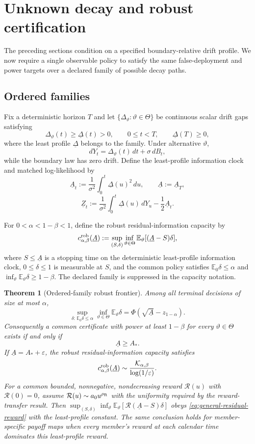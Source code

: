 \documentclass[11pt]{article}
\numberwithin{equation}{section}
\theoremstyle{plain}
\newtheorem{theorem}{Theorem}[section]
\theoremstyle{definition}
\theoremstyle{remark}
\newcommand{\Ezero}{\mathbb E_0}
\begin{document}
\section{Unknown decay and robust certification}\label{unknown-decay-robust-certification}

The preceding sections condition on a specified boundary-relative drift profile.  We now require a single observable policy to satisfy the same false-deployment and power targets over a declared family of possible decay paths.

\subsection{Ordered families}\label{ordered-unknown-decay}

Fix a deterministic horizon $T$ and let $\{\Delta_\vartheta:\vartheta\in\Theta\}$ be continuous scalar drift gaps satisfying
\[
\Delta_\vartheta(t)\ge \underline\Delta(t)>0,
\qquad 0\le t<T,
\qquad \underline\Delta(T)\ge0,
\]
where the least profile $\underline\Delta$ belongs to the family.  Under alternative $\vartheta$,
\[
dY_t=\Delta_\vartheta(t)\,dt+\sigma\,dB_t,
\]
while the boundary law has zero drift.  Define the least-profile information clock and matched log-likelihood by
\[
\underline A_t
:=\frac1{\sigma^2}\int_0^t\underline\Delta(u)^2\,du,
\qquad
\underline A:=\underline A_T,
\]
\[
\underline Z_t
:=\frac1{\sigma^2}\int_0^t\underline\Delta(u)\,dY_u
-\frac12\underline A_t.
\]

For $0<\alpha<1-\beta<1$, define the robust residual-information capacity by
\[
c^{\rm rob}_{\alpha,\beta}(\underline A)
:=\sup_{(S,\delta)}\inf_{\vartheta\in\Theta}
\mathbb E_\vartheta[(\underline A-S)\delta],
\]
where $S\le\underline A$ is a stopping time on the deterministic least-profile information clock, $0\le\delta\le1$ is measurable at $S$, and the common policy satisfies
$\Ezero\delta\le\alpha$ and $\inf_\vartheta\mathbb E_\vartheta\delta\ge1-\beta$.
The declared family is suppressed in the capacity notation.

\begin{theorem}[Ordered-family robust frontier]\label{thm:ordered-decay-frontier}
Among all terminal decisions of size at most $\alpha$,
\[
\sup_{\delta:\,\Ezero\delta\le\alpha}
\inf_{\vartheta\in\Theta}\mathbb E_\vartheta\delta
=
\Phi\!\left(\sqrt{\underline A}-z_{1-\alpha}\right).
\]
Consequently a common certificate with power at least $1-\beta$ for every $\vartheta\in\Theta$ exists if and only if
\[
\underline A\ge A_*.
\]
If $\underline A=A_*+\varepsilon$, the robust residual-information capacity satisfies
\[
c^{\rm rob}_{\alpha,\beta}(\underline A)
\sim
\frac{\mathcal K_{\alpha,\beta}}{\log(1/\varepsilon)}.
\]
For a common bounded, nonnegative, nondecreasing reward $\mathcal R(u)$ with $\mathcal R(0)=0$, assume $\mathcal R(u)\sim a_0u^{\rho_{\rm R}}$ with the uniformity required by the reward-transfer result. Then
$\sup_{(S,\delta)}\inf_\vartheta\mathbb E_\vartheta[\mathcal R(\underline A-S)\delta]$
obeys \eqref{eq:general-residual-reward} with the least-profile constant. The same conclusion holds for member-specific payoff maps when every member's reward at each calendar time dominates this least-profile reward.
\end{theorem}
\end{document}
